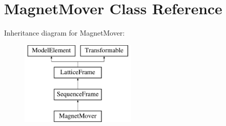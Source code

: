 \hypertarget{classMagnetMover}{}\section{Magnet\+Mover Class Reference}
\label{classMagnetMover}
Inheritance diagram for Magnet\+Mover\+:\begin{figure}[H]
\begin{center}
\leavevmode
\includegraphics[height=4.000000cm]{classMagnetMover}
\end{center}
\end{figure}
